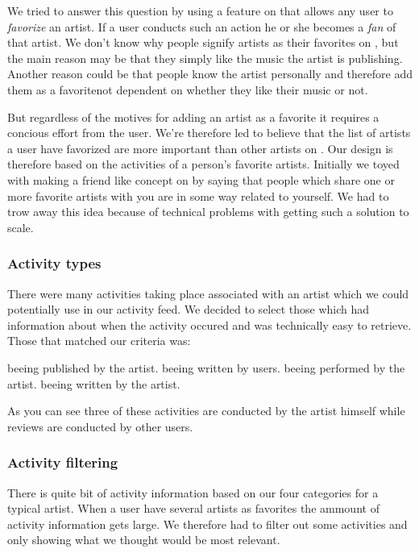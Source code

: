 We tried to answer this question by using a feature on \urort{} that allows
any user to \emph{favorize} an artist. If a user conducts such an action he or
she becomes a \emph{fan} of that artist. We don't know why people signify
artists as their favorites on \urort{}, but the main reason may be that
they simply like the music the artist is publishing.
Another reason could be that people know the artist personally and therefore
add them as a favorite\dash{}not dependent on whether they like their music or
not.

But regardless of the motives for adding an artist as a favorite it requires
a concious effort from the user. We're therefore led to believe that the list
of artists a user have favorized are more important than other artists on
\urort{}. Our design is therefore based on the activities of a person's
favorite artists. Initially we toyed with making a friend like concept on
\urort{} by saying that people which share one or more favorite artists with
you are in some way related to yourself. We had to trow away this idea because
of technical problems with getting such a solution to scale.

\subsubsection{Activity types}

There were many activities taking place associated with an artist
which we could potentially use in our activity feed. We decided to select
those which had information about when the activity occured and was
technically easy%
to retrieve. Those that matched our criteria was:

\begin{items}
   beeing published by the artist.
   beeing written by users.
   beeing performed by the artist.
   beeing written by the artist.
\end{items}

As you can see three of these activities are conducted by the artist himself
while reviews are conducted by other users.

\subsubsection{Activity filtering}

There is quite bit of activity information based on our four categories for
a typical artist. When a user have several artists as favorites the ammount of
activity information gets large. We therefore had to filter out some
activities and only showing what we thought would be most relevant.

